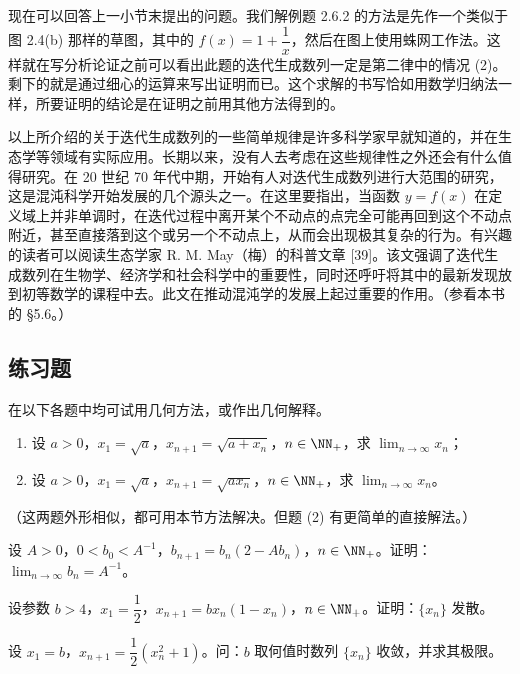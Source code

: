 现在可以回答上一小节末提出的问题。我们解例题 2.6.2 的方法是先作一个类似于图 2.4(b) 那样的草图，其中的 $f(x)=1+\dfrac1x$，然后在图上使用蛛网工作法。这样就在写分析论证之前可以看出此题的迭代生成数列一定是第二律中的情况 (2)。剩下的就是通过细心的运算来写出证明而已。这个求解的书写恰如用数学归纳法一样，所要证明的结论是在证明之前用其他方法得到的。

以上所介绍的关于迭代生成数列的一些简单规律是许多科学家早就知道的，并在生态学等领域有实际应用。长期以来，没有人去考虑在这些规律性之外还会有什么值得研究。在 20 世纪 70 年代中期，开始有人对迭代生成数列进行大范围的研究，这是混沌科学开始发展的几个源头之一。在这里要指出，当函数 $y=f(x)$ 在定义域上并非单调时，在迭代过程中离开某个不动点的点完全可能再回到这个不动点附近，甚至直接落到这个或另一个不动点上，从而会出现极其复杂的行为。有兴趣的读者可以阅读生态学家 R. M. May（梅）的科普文章 [39]。该文强调了迭代生成数列在生物学、经济学和社会科学中的重要性，同时还呼吁将其中的最新发现放到初等数学的课程中去。此文在推动混沌学的发展上起过重要的作用。（参看本书的 §5.6。）

\subsection{练习题}

在以下各题中均可试用几何方法，或作出几何解释。

\begin{xexercise}[1]
\begin{enumerate}[label=(\arabic*)]
    \item 设 $a>0$，$x_1=\sqrt a$，$x_{n+1}=\sqrt{a+x_n}$，$n\in\NN_+$，求 $\displaystyle\lim_{n\to\infty}x_n$；
    \item 设 $a>0$，$x_1=\sqrt a$，$x_{n+1}=\sqrt{ax_n}$，$n\in\NN_+$，求 $\displaystyle\lim_{n\to\infty}x_n$。
  \end{enumerate}
  （这两题外形相似，都可用本节方法解决。但题 (2) 有更简单的直接解法。）
\end{xexercise}

\begin{xexercise}[2]
设 $A>0$，$0<b_0<A^{-1}$，$b_{n+1}=b_n(2-Ab_n)$，$n\in\NN_+$。证明：$\displaystyle\lim_{n\to\infty}b_n=A^{-1}$。
\end{xexercise}

\begin{xexercise}[3]
设参数 $b>4$，$x_1=\dfrac12$，$x_{n+1}=bx_n(1-x_n)$，$n\in\NN_+$。证明：$\{x_n\}$ 发散。
\end{xexercise}

\begin{xexercise}[4]
设 $x_1=b$，$x_{n+1}=\dfrac12(x_n^2+1)$。问：$b$ 取何值时数列 $\{x_n\}$ 收敛，并求其极限。
\end{xexercise}

